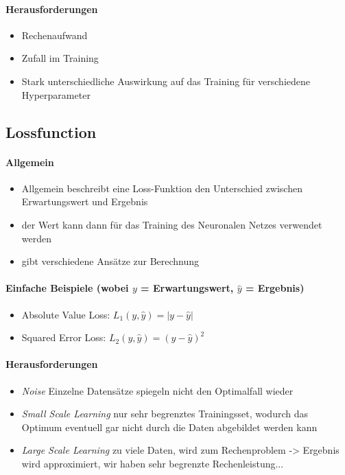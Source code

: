 \paragraph{Herausforderungen \cite{hyperparameters-search-in-machine-learning}}
\begin{itemize}
	\item Rechenaufwand
	\item Zufall im Training
	\item Stark unterschiedliche Auswirkung auf das Training für verschiedene Hyperparameter
\end{itemize}

\subsection{Lossfunction}
\paragraph{Allgemein \cite{lossfunction-opportunities-and-challenges, common-loss, russel-norvig}}
\begin{itemize}
	\item Allgemein beschreibt eine Loss-Funktion den Unterschied zwischen Erwartungswert und Ergebnis
	\item der Wert kann dann für das Training des Neuronalen Netzes verwendet werden
	\item gibt verschiedene Ansätze zur Berechnung
\end{itemize}

\paragraph{Einfache Beispiele (wobei $y$ = Erwartungswert, $\hat{y}$ = Ergebnis) \cite{russel-norvig}}
\begin{itemize}
	\item Absolute Value Loss: $L_1(y, \hat{y}) = |y - \hat{y}|$
	\item Squared Error Loss: $L_2(y, \hat{y}) = (y - \hat{y})^2$
\end{itemize}

\paragraph{Herausforderungen \cite[p. 710]{russel-norvig}}
\begin{itemize}
	\item \textit{Noise} 
	Einzelne Datensätze spiegeln nicht den Optimalfall wieder
	
	\item \textit{Small Scale Learning} 
	nur sehr begrenztes Trainingsset, wodurch das Optimum eventuell gar nicht durch die Daten abgebildet werden kann
	
	\item \textit{Large Scale Learning} 
	zu viele Daten, wird zum Rechenproblem -> Ergebnis wird approximiert, wir haben sehr begrenzte Rechenleistung...
\end{itemize}



